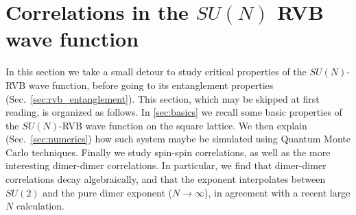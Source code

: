 \documentclass[11pt]{iopart}
\begin{document}
\section{Correlations in the $SU(N)$ RVB wave function}
\label{sec:correlations}
In this section we take a small detour to study critical properties of the $SU(N)$-RVB wave function, before going to its entanglement properties (Sec.~\ref{sec:rvb_entanglement}). This section, which may be skipped at first reading, is organized as follows. In \ref{sec:basics} we recall some basic properties of the $SU(N)$-RVB wave function on the square lattice. We then explain (Sec.~\ref{sec:numerics}) how such system maybe be simulated using Quantum Monte Carlo techniques. Finally we study spin-spin correlations, as well as the more interesting dimer-dimer correlations. In particular, we find that dimer-dimer correlations decay algebraically, and that the exponent interpolates between $SU(2)$\cite{RVB1,RVB2} and the pure dimer exponent ($N\to \infty$), in agreement with a recent large $N$ calculation\cite{Damle}.
\end{document}
